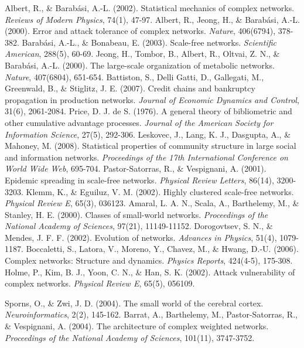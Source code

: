  Albert, R., \& Barabási, A.-L. (2002). Statistical mechanics of complex networks. \textit{Reviews of Modern Physics}, 74(1), 47-97.
 Albert, R., Jeong, H., \& Barabási, A.-L. (2000). Error and attack tolerance of complex networks. \textit{Nature}, 406(6794), 378-382.
 Barabási, A.-L., \& Bonabeau, E. (2003). Scale-free networks. \textit{Scientific American}, 288(5), 60-69.
 Jeong, H., Tombor, B., Albert, R., Oltvai, Z. N., \& Barabási, A.-L. (2000). The large-scale organization of metabolic networks. \textit{Nature}, 407(6804), 651-654.
 Battiston, S., Delli Gatti, D., Gallegati, M., Greenwald, B., \& Stiglitz, J. E. (2007). Credit chains and bankruptcy propagation in production networks. \textit{Journal of Economic Dynamics and Control}, 31(6), 2061-2084.
 Price, D. J. de S. (1976). A general theory of bibliometric and other cumulative advantage processes. \textit{Journal of the American Society for Information Science}, 27(5), 292-306.
 Leskovec, J., Lang, K. J., Dasgupta, A., \& Mahoney, M. (2008). Statistical properties of community structure in large social and information networks. \textit{Proceedings of the 17th International Conference on World Wide Web}, 695-704.
 Pastor-Satorras, R., \& Vespignani, A. (2001). Epidemic spreading in scale-free networks. \textit{Physical Review Letters}, 86(14), 3200-3203.
 Klemm, K., \& Eguiluz, V. M. (2002). Highly clustered scale-free networks. \textit{Physical Review E}, 65(3), 036123.
 Amaral, L. A. N., Scala, A., Barthelemy, M., \& Stanley, H. E. (2000). Classes of small-world networks. \textit{Proceedings of the National Academy of Sciences}, 97(21), 11149-11152.
 Dorogovtsev, S. N., \& Mendes, J. F. F. (2002). Evolution of networks. \textit{Advances in Physics}, 51(4), 1079-1187.
 Boccaletti, S., Latora, V., Moreno, Y., Chavez, M., \& Hwang, D.-U. (2006). Complex networks: Structure and dynamics. \textit{Physics Reports}, 424(4-5), 175-308.
 Holme, P., Kim, B. J., Yoon, C. N., \& Han, S. K. (2002). Attack vulnerability of complex networks. \textit{Physical Review E}, 65(5), 056109.

 Sporns, O., \& Zwi, J. D. (2004). The small world of the cerebral cortex. \textit{Neuroinformatics}, 2(2), 145-162.
 Barrat, A., Barthelemy, M., Pastor-Satorras, R., \& Vespignani, A. (2004). The architecture of complex weighted networks. \textit{Proceedings of the National Academy of Sciences}, 101(11), 3747-3752.

